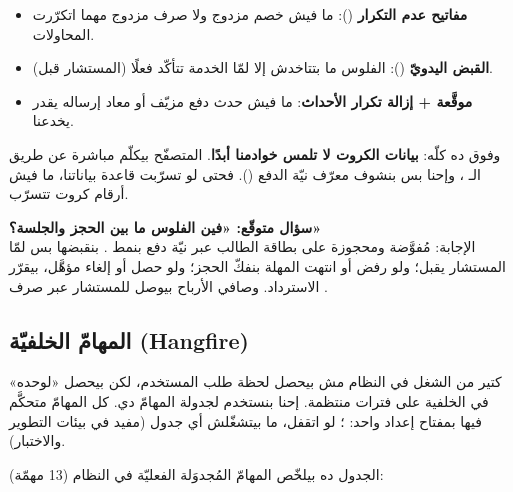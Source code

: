 \begin{secnote}
\begin{itemize}
\item \textbf{مفاتيح عدم التكرار} (): ما فيش خصم مزدوج ولا
  صرف مزدوج مهما اتكرّرت المحاولات.
\item \textbf{القبض اليدويّ} (): الفلوس ما بتتاخدش إلا لمّا
  الخدمة تتأكّد فعلًا (المستشار قبل).
\item \textbf{ موقَّعة + إزالة تكرار الأحداث}: ما فيش حدث دفع مزيّف
  أو معاد إرساله يقدر يخدعنا.
\end{itemize}
وفوق ده كلّه: \textbf{بيانات الكروت لا تلمس خوادمنا أبدًا}. المتصفّح بيكلّم
 مباشرة عن طريق الـ ، وإحنا بس بنشوف معرّف نيّة
الدفع (). فحتى لو تسرّبت قاعدة بياناتنا، ما فيش أرقام كروت تتسرّب.
\end{secnote}

\begin{qa}
\textbf{سؤال متوقّع: «فين الفلوس ما بين الحجز والجلسة؟»} \\
الإجابة: مُفوَّضة ومحجوزة على بطاقة الطالب عبر نيّة دفع بنمط .
بنقبضها بس لمّا المستشار يقبل؛ ولو رفض أو انتهت المهلة بنفكّ الحجز؛ ولو حصل
 أو إلغاء مؤهَّل،  بيقرّر الاسترداد.
وصافي الأرباح بيوصل للمستشار عبر صرف .
\end{qa}

\subsection{المهامّ الخلفيّة (Hangfire)}

كتير من الشغل في النظام مش بيحصل لحظة طلب المستخدم، لكن بيحصل «لوحده» في الخلفية
على فترات منتظمة. إحنا بنستخدم  لجدولة المهامّ دي. كل المهامّ
متحكَّم فيها بمفتاح إعداد واحد: ؛ لو اتقفل، ما بيتشغّلش أي
جدول (مفيد في بيئات التطوير والاختبار).

الجدول ده بيلخّص المهامّ المُجدوَلة الفعليّة في النظام (13 مهمّة):

